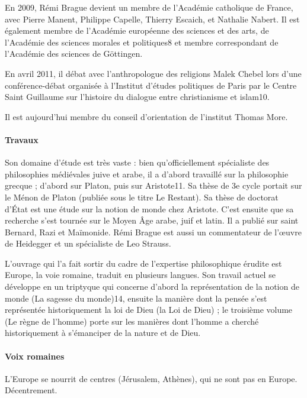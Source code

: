 En 2009, Rémi Brague devient un membre de l'Académie catholique de France, avec Pierre Manent, Philippe Capelle, Thierry Escaich, et Nathalie Nabert. Il est également membre de l'Académie européenne des sciences et des arts, de l'Académie des sciences morales et politiques8 et membre correspondant de l'Académie des sciences de Göttingen.

En avril 2011, il débat avec l'anthropologue des religions Malek Chebel lors d'une conférence-débat organisée à l'Institut d'études politiques de Paris par le Centre Saint Guillaume sur l'histoire du dialogue entre christianisme et islam10.

Il est aujourd'hui membre du conseil d'orientation de l'institut Thomas More.

\paragraph{Travaux}
Son domaine d'étude est très vaste : bien qu'officiellement spécialiste des philosophies médiévales juive et arabe, il a d'abord travaillé sur la philosophie grecque ; d'abord sur Platon, puis sur Aristote11. Sa thèse de 3e cycle portait sur le Ménon de Platon (publiée sous le titre Le Restant). Sa thèse de doctorat d'État est une étude sur la notion de monde chez Aristote. C'est ensuite que sa recherche s'est tournée sur le Moyen Âge arabe, juif et latin. Il a publié sur saint Bernard, Razi et Maïmonide. Rémi Brague est aussi un commentateur de l'œuvre de Heidegger et un spécialiste de Leo Strauss.

L'ouvrage qui l'a fait sortir du cadre de l'expertise philosophique érudite est Europe, la voie romaine, traduit en plusieurs langues. Son travail actuel se développe en un triptyque qui concerne d'abord la représentation de la notion de monde (La sagesse du monde)14, ensuite la manière dont la pensée s'est représentée historiquement la loi de Dieu (la Loi de Dieu) ; le troisième volume (Le règne de l'homme) porte sur les manières dont l'homme a cherché historiquement à s'émanciper de la nature et de Dieu.

\paragraph{Voix romaines} L'Europe se nourrit de centres (Jérusalem, Athènes), qui ne sont pas en Europe. Décentrement. 
\begin{Ex}

\end{Ex}

